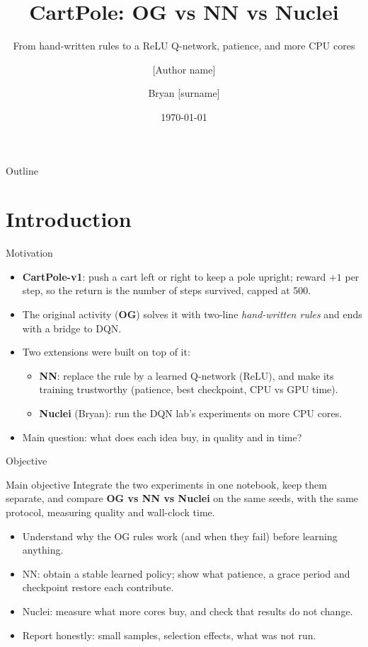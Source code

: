\documentclass[aspectratio=169]{beamer}
\title[CartPole: OG vs NN vs Nuclei]{CartPole: OG vs NN vs Nuclei}
\subtitle{From hand-written rules to a ReLU Q-network, patience, and more CPU cores}
\author[Authors]{[Author name] \and Bryan [surname]}
\institute[Intelligent Agents]{Intelligent Agents\\RL101 -- CartPole activity\\\texttt{[email]}}
\date{\today}
\begin{document}
\begin{frame}
  \titlepage
\end{frame}

\begin{frame}{Outline}
\tableofcontents
\end{frame}

\section{Introduction}

\begin{frame}{Motivation}
\begin{itemize}
  \item \textbf{CartPole-v1}: push a cart left or right to keep a pole upright; reward $+1$ per step, so the \alert{return is the number of steps survived}, capped at 500.
  \item The original activity (\textbf{OG}) solves it with two-line \emph{hand-written rules} and ends with a bridge to DQN.
  \item Two extensions were built on top of it:
  \begin{itemize}
    \item \textbf{NN}: replace the rule by a learned Q-network (ReLU), and make its training trustworthy (patience, best checkpoint, CPU vs GPU time).
    \item \textbf{Nuclei} (Bryan): run the DQN lab's experiments on \alert{more CPU cores}.
  \end{itemize}
  \item Main question: what does each idea buy, in \alert{quality} and in \alert{time}?
\end{itemize}
\end{frame}

\begin{frame}{Objective}
\begin{block}{Main objective}
Integrate the two experiments in one notebook, keep them separate, and compare \textbf{OG vs NN vs Nuclei} on the same seeds, with the same protocol, measuring quality and wall-clock time.
\end{block}

\begin{itemize}
  \item Understand why the OG rules work (and when they fail) before learning anything.
  \item NN: obtain a stable learned policy; show what patience, a grace period and checkpoint restore each contribute.
  \item Nuclei: measure what more cores buy, and check that results do not change.
  \item Report honestly: small samples, selection effects, what was not run.
\end{itemize}
\end{frame}
\end{document}
